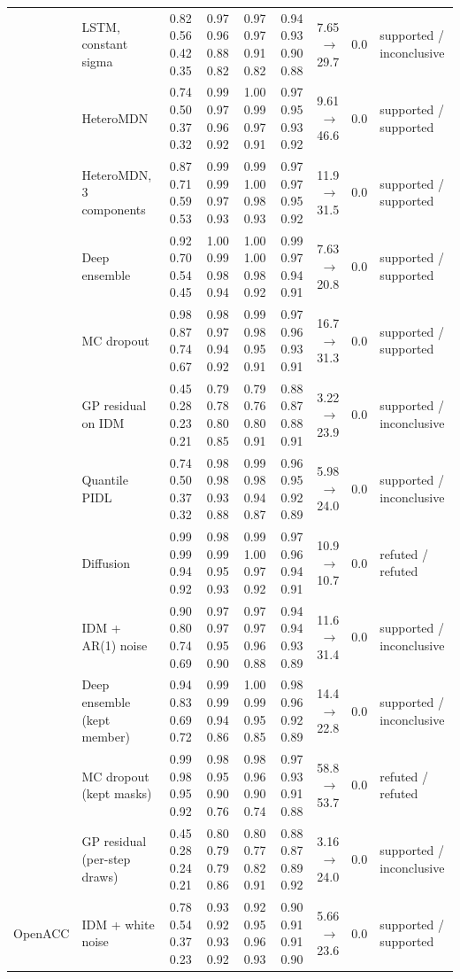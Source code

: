 \begin{longtable}{llrrrrrrl}
 & LSTM, constant sigma & 0.82 0.56 0.42 0.35 & 0.97 0.96 0.88 0.82 & 0.97 0.97 0.91 0.82 & 0.94 0.93 0.90 0.88 & 7.65 $\rightarrow$ 29.7 & 0.0 & supported / inconclusive \\
 & HeteroMDN & 0.74 0.50 0.37 0.32 & 0.99 0.97 0.96 0.92 & 1.00 0.99 0.97 0.91 & 0.97 0.95 0.93 0.92 & 9.61 $\rightarrow$ 46.6 & 0.0 & supported / supported \\
 & HeteroMDN, 3 components & 0.87 0.71 0.59 0.53 & 0.99 0.99 0.97 0.93 & 0.99 1.00 0.98 0.93 & 0.97 0.97 0.95 0.92 & 11.9 $\rightarrow$ 31.5 & 0.0 & supported / supported \\
 & Deep ensemble & 0.92 0.70 0.54 0.45 & 1.00 0.99 0.98 0.94 & 1.00 1.00 0.98 0.92 & 0.99 0.97 0.94 0.91 & 7.63 $\rightarrow$ 20.8 & 0.0 & supported / supported \\
 & MC dropout & 0.98 0.87 0.74 0.67 & 0.98 0.97 0.94 0.92 & 0.99 0.98 0.95 0.91 & 0.97 0.96 0.93 0.91 & 16.7 $\rightarrow$ 31.3 & 0.0 & supported / supported \\
 & GP residual on IDM & 0.45 0.28 0.23 0.21 & 0.79 0.78 0.80 0.85 & 0.79 0.76 0.80 0.91 & 0.88 0.87 0.88 0.91 & 3.22 $\rightarrow$ 23.9 & 0.0 & supported / inconclusive \\
 & Quantile PIDL & 0.74 0.50 0.37 0.32 & 0.98 0.98 0.93 0.88 & 0.99 0.98 0.94 0.87 & 0.96 0.95 0.92 0.89 & 5.98 $\rightarrow$ 24.0 & 0.0 & supported / inconclusive \\
 & Diffusion & 0.99 0.99 0.94 0.92 & 0.98 0.99 0.95 0.93 & 0.99 1.00 0.97 0.92 & 0.97 0.96 0.94 0.91 & 10.9 $\rightarrow$ 10.7 & 0.0 & refuted / refuted \\
 & IDM + AR(1) noise & 0.90 0.80 0.74 0.69 & 0.97 0.97 0.95 0.90 & 0.97 0.97 0.96 0.88 & 0.94 0.94 0.93 0.89 & 11.6 $\rightarrow$ 31.4 & 0.0 & supported / inconclusive \\
 & Deep ensemble (kept member) & 0.94 0.83 0.69 0.72 & 0.99 0.99 0.94 0.86 & 1.00 0.99 0.95 0.85 & 0.98 0.96 0.92 0.89 & 14.4 $\rightarrow$ 22.8 & 0.0 & supported / inconclusive \\
 & MC dropout (kept masks) & 0.99 0.98 0.95 0.92 & 0.98 0.95 0.90 0.76 & 0.98 0.96 0.90 0.74 & 0.97 0.93 0.91 0.88 & 58.8 $\rightarrow$ 53.7 & 0.0 & refuted / refuted \\
 & GP residual (per-step draws) & 0.45 0.28 0.24 0.21 & 0.80 0.79 0.79 0.86 & 0.80 0.77 0.82 0.91 & 0.88 0.87 0.89 0.92 & 3.16 $\rightarrow$ 24.0 & 0.0 & supported / inconclusive \\
\midrule
OpenACC & IDM + white noise & 0.78 0.54 0.37 0.23 & 0.93 0.92 0.93 0.92 & 0.92 0.95 0.96 0.93 & 0.90 0.91 0.91 0.90 & 5.66 $\rightarrow$ 23.6 & 0.0 & supported / supported \\

\end{longtable}
